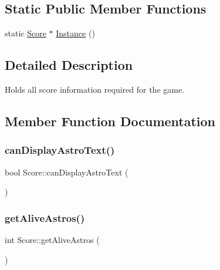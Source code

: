 \subsection*{Static Public Member Functions}
\begin{DoxyCompactItemize}
\item 
static \hyperlink{class_score}{Score} $\ast$ \hyperlink{class_score_a7d5516454642a247be184d5063404d04}{Instance} ()
\end{DoxyCompactItemize}


\subsection{Detailed Description}
Holds all score information required for the game. 



\subsection{Member Function Documentation}
\mbox{\label{class_score_a915cd675992bb150fcd67b43f7b8732e}} 
\subsubsection{\texorpdfstring{can\+Display\+Astro\+Text()}{canDisplayAstroText()}}
{\footnotesize\ttfamily bool Score\+::can\+Display\+Astro\+Text (\begin{DoxyParamCaption}{ }\end{DoxyParamCaption})}

\mbox{\label{class_score_ad997fd059028945d10cfc8c056540a4f}} 
\subsubsection{\texorpdfstring{get\+Alive\+Astros()}{getAliveAstros()}}
{\footnotesize\ttfamily int Score\+::get\+Alive\+Astros (\begin{DoxyParamCaption}{ }\end{DoxyParamCaption})}

\mbox{\label{class_score_a4004909c5ca1ac466d55d32c5f6a30fd}} 
